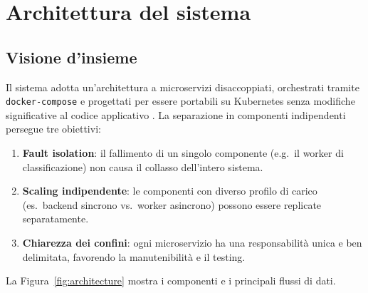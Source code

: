 \chapter{Architettura del sistema}
\label{chap:architettura}

\section{Visione d'insieme}
\label{sec:visione_insieme}

Il sistema adotta un'architettura a microservizi disaccoppiati, orchestrati tramite
\texttt{docker-compose} e progettati per essere portabili su Kubernetes senza modifiche
significative al codice applicativo .
La separazione in componenti indipendenti persegue tre obiettivi:

\begin{enumerate}[leftmargin=*]
    \item \textbf{Fault isolation}: il fallimento di un singolo componente (e.g.\ il worker
          di classificazione) non causa il collasso dell'intero sistema.
    \item \textbf{Scaling indipendente}: le componenti con diverso profilo di carico
          (es.\ backend sincrono vs.\ worker asincrono) possono essere replicate
          separatamente.
    \item \textbf{Chiarezza dei confini}: ogni microservizio ha una responsabilit\`a
          unica e ben delimitata, favorendo la manutenibilit\`a e il testing.
\end{enumerate}

La Figura~\ref{fig:architecture} mostra i componenti e i principali flussi di dati.

